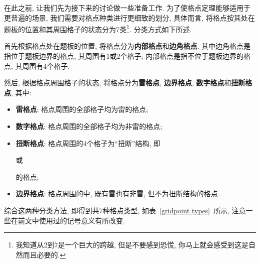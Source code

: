 \documentclass{ctexart}
\begin{document}
在此之前, 让我们先为接下来的讨论做一些准备工作. 为了使格点定理能够适用于更普遍的场景, 我们需要对格点种类进行更细致的划分, 具体而言, 将格点按其处在题板的位置和其周围格子的状态分为7类\footnote{我知道从2到7是一个巨大的跨越, 但是不要感到恐慌, 你马上就会感受到这是自然而且必要的.}.
分类方式如下所述.

首先根据格点处在题板的位置, 将格点分为\textbf{内部格点}和\textbf{边角格点}. 其中边角格点是指位于题板边界的格点, 其周围有1或2个格子; 内部格点是指不位于题板边界的格点, 其周围有4个格子.

然后, 根据格点周围格子的状态, 将格点分为\textbf{雷格点}, \textbf{边界格点}, \textbf{数字格点}和\textbf{扭断格点}, 其中:
\begin{itemize}
    \item \textbf{雷格点}: 格点周围的全部格子均为雷的格点;
    \item \textbf{数字格点}: 格点周围的全部格子均为非雷的格点;
    \item \textbf{扭断格点}: 格点周围的4个格子为``扭断''结构, 即
        或
        的格点;
    \item \textbf{边界格点}: 格点周围的中, 既有雷也有非雷, 但不为扭断结构的格点.
\end{itemize}
综合这两种分类方法, 即得到共7种格点类型, 如表\ \ref{gridpoint types}\ 所示, 注意一些在前文中使用过的记号意义有所改变.
\end{document}

